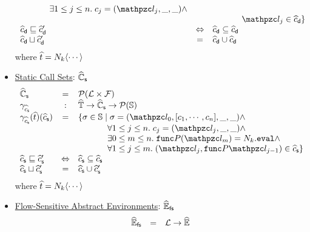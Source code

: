\documentclass[10pt,conference]{IEEEtran}
\begin{document}
\begin{itemize}
\[\begin{array}{lcl}
          \phantom{\{ \st \in \stset \mid}
          \exists 1 \leq j \leq n. \; \ctxt_j = (\lab_j, \_, \_) \wedge\\&&

          \phantom{\{ \st \in \stset \mid}
          \lab_j \in \adcall
        \}\\

        \adcall \order \adcall' &\Leftrightarrow&
        \adcall \subseteq \adcall\\

        \adcall \join \adcall' &=&
        \adcall \cup \adcall\\
      \end{array}
    \]
    where $\widehat{t} = N_k \langle \cdots \rangle$

  \item \underline{Static Call Sets}: $\widehat{\mathbb{C}}_{\textsf{s}}$
    \[
      \begin{array}{lcl}
        \ascallset &=& \powerset{\labset \times \funcset}\\

        \ascallgamma &:& \atreeset \rightarrow \ascallset \rightarrow
        \powerset{\stset}\\

        \ascallgamma(\atree)(\ascall) &=& \{ \st \in \stset \mid
          \st = (\lab_0, [\ctxt_1, \cdots, \ctxt_n], \_, \_) \wedge\\&&

          \phantom{\{ \st \in \stset \mid}
          \forall 1 \leq j \leq n. \; \ctxt_j = (\lab_j, \_, \_) \wedge\\&&

          \phantom{\{ \st \in \stset \mid}
          \exists 0 \leq m \leq n. \; \getfunc{\prog}(\lab_m) = \nt_k.\eval
          \wedge\\&&

          \phantom{\{ \st \in \stset \mid}
          \forall 1 \leq j \leq m. \; (\lab_j, \getfunc{\prog}{\lab_{j-1}}) \in
          \ascall
        \}\\

        \ascall \order \ascall' &\Leftrightarrow& \ascall \subseteq \ascall\\

        \ascall \join \ascall' &=& \ascall \cup \ascall'\\
      \end{array}
    \]
    where $\widehat{t} = N_k \langle \cdots \rangle$

  \item \underline{Flow-Sensitive Abstract Environments}: $\widehat{\mathbb{E}}_{\textsf{fs}}$
    \[
      \begin{array}{lcl}
        \widehat{\mathbb{E}}_{\textsf{fs}} &=& \mathcal{L} \rightarrow \widehat{\mathbb{E}}\\


\end{array}\]
\end{itemize}
\end{document}
